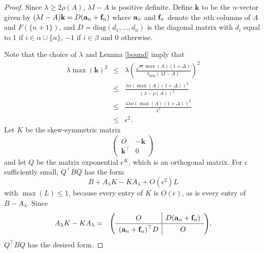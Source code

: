 \documentclass[11pt]{article}
\theoremstyle{definition}
\theoremstyle{definition}
\theoremstyle{definition}
\newcommand{\ba}{{\bf a}}
\newcommand{\bff}{{\bf f}}
\newcommand{\lam}{\lambda}
\def\trans{^{\top}}
\begin{document}
\begin{proof}  
Since  $\lambda \ge 2  \rho(A)$,   $\lambda I-A$ is positive definite.
Define $\mathbf{k}$ to be the $n$-vector given by $(\lambda I-A)\mathbf{k} = D(\ba_{n}+\bff_{n})$ where $\ba_n$ and $\bff_n$ denote  the $n$th columns of $A$ and $F(\{n+1\})$, and $D=\mbox{diag}(d_1, \ldots, d_n)$ is the diagonal 
matrix with  $d_i$ equal to  $1$  if $i \in \alpha\cup\{n\}$, $-1$ if $i\in \beta$ and $0$ otherwise. 

Note  that the  choice of $\lambda$ and Lemma \ref{bound} imply that 
\begin{eqnarray*}
\lambda \max(\mathbf{k})^2  &\leq & \lambda \left( \frac{\sqrt{n} \max (A)(1 + \Delta)}{\lambda_{\min}(\lambda I-A)} \right)^2  
\\
& \leq &\frac{\lambda n (\max(A)(1+ \Delta))^2}{(\lambda-\rho(A))^2} 
\\ 
& \leq & \frac{4\lambda n (\max(A)(1+ \Delta))^2}{\lambda^2}\\
& \leq &  \epsilon^2 .
\end{eqnarray*}
Let  $K$ be the skew-symmetric matrix
\[\renewcommand{\arraystretch}{1.3} 
\left( 
\begin{array}{c|c} O & -\mathbf{k} 
\\  \hline
\mathbf{k}\trans & 0 \end{array} \right)
\]
and let $Q$ be the matrix exponential $e^{K}$, which is an orthogonal matrix.
For $\epsilon$ sufficiently small, 
 $Q\trans BQ$ has the form 
\[
B+  A_{\lambda} K - KA_{\lambda} %
+ O(\epsilon^2)L 
\]
with $\max(L)\leq 1$, because every entry of $K$ is $O(\epsilon)$, as is every entry of $B-A_\lam$. 
Since \begin{eqnarray*}
A_{\lambda} K - KA_{\lambda} &=&
 \left(\renewcommand{\arraystretch}{1.3}  \begin{array}{c|c} O & D(\mathbf{a}_n+\mathbf{f}_n) \\ \hline
(\mathbf{a}_n+\mathbf{f}_n)\trans D  &O  \end{array} \right)\!,
\end{eqnarray*}
 $Q\trans BQ$ has the desired form. 
\end{proof}
\end{document}
